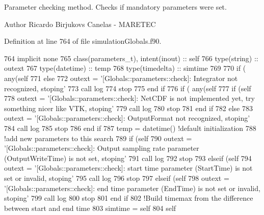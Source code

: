Parameter checking method. Checks if mandatory parameters were set. 

\begin{DoxyAuthor}{Author}
Ricardo Birjukovs Canelas -\/ M\+A\+R\+E\+T\+EC 
\end{DoxyAuthor}


Definition at line 764 of file simulation\+Globals.\+f90.


\begin{DoxyCode}
764     \textcolor{keywordtype}{implicit none}
765     \textcolor{keywordtype}{class}(parameters\_t), \textcolor{keywordtype}{intent(inout)} :: self
766     \textcolor{keywordtype}{type}(string) :: outext
767     \textcolor{keywordtype}{type}(datetime) :: temp
768     \textcolor{keywordtype}{type}(timedelta) :: simtime
769 
770     \textcolor{keywordflow}{if} ( any(self%
771     \textcolor{keywordflow}{else}
772         outext = \textcolor{stringliteral}{'[Globals::parameters::check]: Integrator not recognized, stoping'}
773         \textcolor{keyword}{call }log%
774         stop
775 \textcolor{keywordflow}{    end if}
776     \textcolor{keywordflow}{if} ( any(self%
777         \textcolor{keywordflow}{if} (self%
778             outext = \textcolor{stringliteral}{'[Globals::parameters::check]: NetCDF is not implemented yet, try something nicer like
       VTK, stoping'}
779             \textcolor{keyword}{call }log%
780             stop
781 \textcolor{keywordflow}{        end if}
782     \textcolor{keywordflow}{else}
783         outext = \textcolor{stringliteral}{'[Globals::parameters::check]: OutputFormat not recognized, stoping'}
784         \textcolor{keyword}{call }log%
785         stop
786 \textcolor{keywordflow}{    end if}
787     temp = datetime() \textcolor{comment}{!default initialization}
788     \textcolor{comment}{!add new parameters to this search}
789     \textcolor{keywordflow}{if} (self%
790         outext = \textcolor{stringliteral}{'[Globals::parameters::check]: Output sampling rate parameter (OutputWriteTime) is not
       set, stoping'}
791         \textcolor{keyword}{call }log%
792         stop
793     \textcolor{keywordflow}{elseif} (self%
794         outext = \textcolor{stringliteral}{'[Globals::parameters::check]: start time parameter (StartTime) is not set or invalid,
       stoping'}
795         \textcolor{keyword}{call }log%
796         stop
797     \textcolor{keywordflow}{elseif} (self%
798         outext = \textcolor{stringliteral}{'[Globals::parameters::check]: end time parameter (EndTime) is not set or invalid,
       stoping'}
799         \textcolor{keyword}{call }log%
800         stop
801 \textcolor{keywordflow}{    end if}
802     \textcolor{comment}{!Build timemax from the difference between start and end time}
803     simtime = self%
804     self%
\end{DoxyCode}
